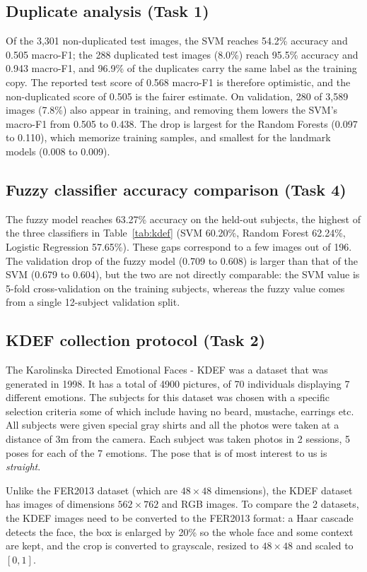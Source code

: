 \FloatBarrier
\subsection{Duplicate analysis (Task 1)}
\label{app:dup}
Of the 3,301 non-duplicated test images, the SVM reaches 54.2\% accuracy and 0.505 macro-F1; the 288 duplicated test images (8.0\%) reach 95.5\% accuracy and 0.943 macro-F1, and 96.9\% of the duplicates carry the same label as the training copy. The reported test score of 0.568 macro-F1 is therefore optimistic, and the non-duplicated score of 0.505 is the fairer estimate. On validation, 280 of 3,589 images (7.8\%) also appear in training, and removing them lowers the SVM's macro-F1 from 0.505 to 0.438. The drop is largest for the Random Forests (0.097 to 0.110), which memorize training samples, and smallest for the landmark models (0.008 to 0.009).

\FloatBarrier
\subsection{Fuzzy classifier accuracy comparison (Task 4)}
\label{app:fuzzy-acc}
The fuzzy model reaches 63.27\% accuracy on the held-out subjects, the highest of the three classifiers in Table~\ref{tab:kdef} (SVM 60.20\%, Random Forest 62.24\%, Logistic Regression 57.65\%). These gaps correspond to a few images out of 196. The validation drop of the fuzzy model (0.709 to 0.608) is larger than that of the SVM (0.679 to 0.604), but the two are not directly comparable: the SVM value is 5-fold cross-validation on the training subjects, whereas the fuzzy value comes from a single 12-subject validation split.

\FloatBarrier
\subsection{KDEF collection protocol (Task 2)}
\label{app:kdef-desc}
The Karolinska Directed Emotional Faces - KDEF was a dataset that was generated in 1998. It has a total of 4900 pictures, of 70 individuals displaying 7 different emotions. The subjects for this dataset was chosen with a specific selection criteria some of which include having no beard, mustache, earrings etc. All subjects were given special gray shirts and all the photos were taken at a distance of 3m from the camera. Each subject was taken photos in 2 sessions, 5 poses for each of the 7 emotions. The pose that is of most interest to us is \textit{straight}.

Unlike the FER2013 dataset (which are $48\times48$ dimensions), the KDEF dataset has images of dimensions $562\times762$ and RGB images. To compare the 2 datasets, the KDEF images need to be converted to the FER2013 format: a Haar cascade detects the face, the box is enlarged by 20\% so the whole face and some context are kept, and the crop is converted to grayscale, resized to $48\times48$ and scaled to $[0,1]$.
